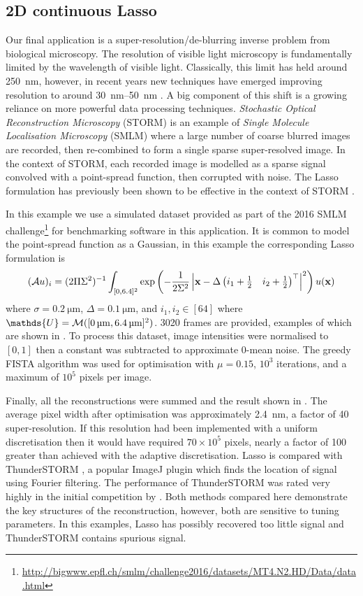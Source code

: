 \documentclass[10pt,a4paper,onecolumn]{article}
\numberwithin{equation}{section}
\let\F\mathds\let\C\mathcal\newcommand{\R}{\F{R}}\newcommand{\A}{\C{A}}
\renewcommand{\vec}{\mathbf}
\newcommand{\UCmath}[1]{%
	\begingroup
	\ucmathlist\uppercase\expandafter{#1}%
	\endgroup
}
\newcommand{\ucmathlist}{%
	\def\alpha{\mathrm{A}}%
	\def\beta{\mathrm{B}}%
	\let\gamma=\Gamma
	\let\delta=\Delta
	\def\epsilon{\mathrm{E}}%
	\def\varepsilon{\mathrm{E}}%
	\def\zeta{\mathrm{Z}}%
	\def\eta{\mathrm{H}}%
	\let\theta=\Theta
	\let\vartheta=\Theta
	\def\iota{\mathrm{I}}%
	\def\kappa{\mathrm{K}}%
	\let\lambda=\Lambda
	\def\mu{\mathrm{M}}%
	\def\nu{\mathrm{N}}%
	\let\xi=\Xi
	\let\pi=\Pi
	\let\varpi=\Pi
	\def\rho{\mathrm{P}}%
	\def\varrho{\mathrm{P}}%
	\let\sigma=\Sigma
	\def\tau{\mathrm{T}}%
	\let\upsilon=\Upsilon
	\let\phi=\Phi
	\let\varphi=\Phi
	\def\chi{\mathrm{X}}%
	\let\psi=\Psi
	\let\omega=\Omega
}
\newcommand{\caps}[1]{\UCmath{#1}}
\newcommand*{\varf}[1]{%
	\IfEqCase{#1}{%
		{0}{u}%
		{1}{v}%
		{2}{w}%
	}[u#1]%
}
\newcommand*{\spcf}[1]{%
	\IfEqCase{#1}{%
		{0}{\F{U}}%
		{1}{\F{V}}%
		{2}{\F{W}}%
	}[\F{U}#1]%
}
\newcommand*{\varx}[1]{%
	\IfEqCase{#1}{%
		{0}{x}%
		{1}{y}%
		{2}{z}%
		{3}{r}%
	}[x#1]%
}
\newcommand*{\Varx}[1]{\caps{\varx{#1}}}
\newcommand*{\vvarx}[1]{\vec{\varx{#1}}}\newcommand*{\vVarx}[1]{\vec{\Varx{#1}}}
\begin{document}
\subsection{2D continuous Lasso}
Our final application is a super-resolution/de-blurring inverse problem from biological microscopy. The resolution of visible light microscopy is fundamentally limited by the wavelength of visible light. Classically, this limit has held around \SI{250}{\nano\meter}, however, in recent years new techniques have emerged improving resolution to around \SIrange{30}{50}{\nano\meter} \cite{Schermelleh2019}. A big component of this shift is a growing reliance on more powerful data processing techniques. \emph{Stochastic Optical Reconstruction Microscopy} (STORM) is an example of \emph{Single Molecule Localisation Microscopy} (SMLM) where a large number of coarse blurred images are recorded, then re-combined to form a single sparse super-resolved image. In the context of STORM, each recorded image is modelled as a sparse signal convolved with a point-spread function, then corrupted with noise. The Lasso formulation has previously been shown to be effective in the context of STORM \cite{Huang2017,Denoyelle2019}.

In this example we use a simulated dataset provided as part of the 2016 SMLM challenge\footnote{\url{http://bigwww.epfl.ch/smlm/challenge2016/datasets/MT4.N2.HD/Data/data.html}} for benchmarking software in this application. It is common to model the point-spread function as a Gaussian, in this example the corresponding Lasso formulation  is 
$$ (\A\varf0)_{i} = (2\pi\sigma^2)^{-1}\int_{[0,6.4]^2} \exp\left(-\frac{1}{2\sigma^2}\left|\vvarx0- \Delta\begin{pmatrix}i_1+\tfrac12 & i_2+\tfrac12\end{pmatrix}^\top \right|^2\right)\varf0(\vvarx0)$$
where $\sigma=\SI{0.2}{\micro\meter}$, $\Delta=\SI{0.1}{\micro\meter}$, and $i_1,i_2\in[64]$ where $\spcf0=\C M([\SI{0}{\micro\meter},\SI{6.4}{\micro\meter}]^2)$. 3020 frames are provided, examples of which are shown in . To process this dataset, image intensities were normalised to $[0,1]$ then a constant was subtracted to approximate 0-mean noise. The greedy FISTA algorithm was used for optimisation with $\mu=0.15$, $10^3$ iterations, and a maximum of $10^5$ pixels per image. 

Finally, all the reconstructions were summed and the result shown in . The average pixel width after optimisation was approximately \SI{2.4}{\nano\meter}, a factor of 40 super-resolution. If this resolution had been implemented with a uniform discretisation then it would have required $70\times 10^5$ pixels, nearly a factor of 100 greater than achieved with the adaptive discretisation. Lasso is compared with ThunderSTORM \cite{Ovesny2014}, a popular ImageJ plugin \cite{Schindelin2012} which finds the location of signal using Fourier filtering. The performance of ThunderSTORM was rated very highly in the initial competition by \cite{Sage2015}. Both methods compared here demonstrate the key structures of the reconstruction, however, both are sensitive to tuning parameters. In this examples, Lasso has possibly recovered too little signal and ThunderSTORM contains spurious signal. 
\end{document}
